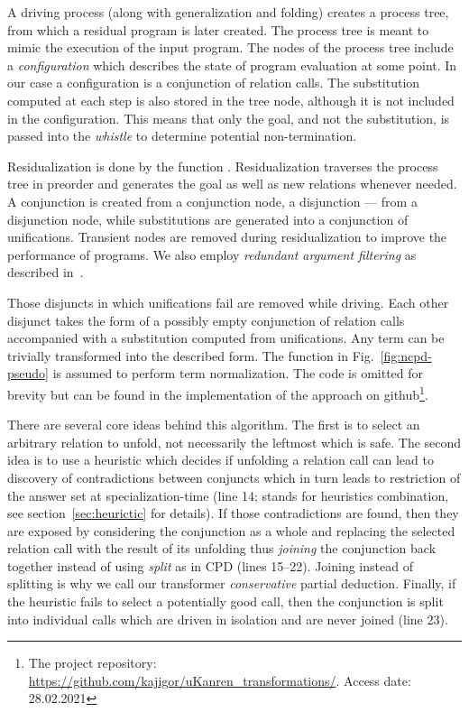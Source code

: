 A driving process (along with generalization and folding) creates a process tree, from which a residual program is later created.
The process tree is meant to mimic the execution of the input program.
The nodes of the process tree include a \emph{configuration} which describes the state of program evaluation at some point.
In our case a configuration is a conjunction of relation calls.
The substitution computed at each step is also stored in the tree node, although it is not included in the configuration.
This means that only the goal, and not the substitution, is passed into the \emph{whistle} to determine potential non-termination.

Residualization is done by the function .
Residualization traverses the process tree in preorder and generates the \mk goal as well as new relations whenever needed.
A conjunction is created from a conjunction node, a disjunction --- from a disjunction node, while substitutions are generated into a conjunction of unifications.
Transient nodes are removed during residualization to improve the performance of programs.
We also employ \emph{redundant argument filtering} as described in~\cite{leuschel1996redundant}.

Those disjuncts in which unifications fail are removed while driving.
Each other disjunct takes the form of a possibly empty conjunction of relation calls accompanied with a substitution computed from unifications.
Any \mk term can be trivially transformed into the described form.
The function  in Fig.~\ref{fig:ncpd-pseudo} is assumed to perform term normalization.
The code is omitted for brevity but can be found in the implementation of the approach on github\footnote{The project repository: \url{https://github.com/kajigor/uKanren_transformations/}. Access date: 28.02.2021}.



There are several core ideas behind this algorithm.
The first is to select an arbitrary relation to unfold, not necessarily the leftmost which is safe.
The second idea is to use a heuristic which decides if unfolding a relation call can lead to discovery of contradictions between conjuncts which in turn leads to restriction of the answer set at specialization-time (line 14;  stands for heuristics combination, see section~\ref{sec:heurictic} for details).
If those contradictions are found, then they are exposed by considering the conjunction as a whole and replacing the selected relation call with the result of its unfolding thus \emph{joining} the conjunction back together instead of using \emph{split} as in CPD (lines 15--22).
Joining instead of splitting is why we call our transformer \emph{conservative} partial deduction.
Finally, if the heuristic fails to select a potentially good call, then the conjunction is split into individual calls which are driven in isolation and are never joined (line 23).

